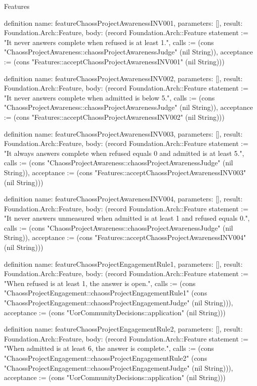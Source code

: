 \begin{lexlean}{Features}
\begin{semanticmodule}
definition{
  name: featureChaossProjectAwarenessINV001,
  parameters: [],
  result: Foundation.Arch::Feature,
  body: (record Foundation.Arch::Feature {statement := "It never answers complete when refused is at least 1.", calls := (cons "ChaossProjectAwareness::chaossProjectAwarenessJudge" (nil String)), acceptance := (cons "Features::acceptChaossProjectAwarenessINV001" (nil String))})
}

definition{
  name: featureChaossProjectAwarenessINV002,
  parameters: [],
  result: Foundation.Arch::Feature,
  body: (record Foundation.Arch::Feature {statement := "It never answers complete when admitted is below 5.", calls := (cons "ChaossProjectAwareness::chaossProjectAwarenessJudge" (nil String)), acceptance := (cons "Features::acceptChaossProjectAwarenessINV002" (nil String))})
}

definition{
  name: featureChaossProjectAwarenessINV003,
  parameters: [],
  result: Foundation.Arch::Feature,
  body: (record Foundation.Arch::Feature {statement := "It always answers complete when refused equals 0 and admitted is at least 5.", calls := (cons "ChaossProjectAwareness::chaossProjectAwarenessJudge" (nil String)), acceptance := (cons "Features::acceptChaossProjectAwarenessINV003" (nil String))})
}

definition{
  name: featureChaossProjectAwarenessINV004,
  parameters: [],
  result: Foundation.Arch::Feature,
  body: (record Foundation.Arch::Feature {statement := "It never answers unmeasured when admitted is at least 1 and refused equals 0.", calls := (cons "ChaossProjectAwareness::chaossProjectAwarenessJudge" (nil String)), acceptance := (cons "Features::acceptChaossProjectAwarenessINV004" (nil String))})
}

definition{
  name: featureChaossProjectEngagementRule1,
  parameters: [],
  result: Foundation.Arch::Feature,
  body: (record Foundation.Arch::Feature {statement := "When refused is at least 1, the answer is open.", calls := (cons "ChaossProjectEngagement::chaossProjectEngagementRule1" (cons "ChaossProjectEngagement::chaossProjectEngagementJudge" (nil String))), acceptance := (cons "UorCommunityDecisions::application" (nil String))})
}

definition{
  name: featureChaossProjectEngagementRule2,
  parameters: [],
  result: Foundation.Arch::Feature,
  body: (record Foundation.Arch::Feature {statement := "When admitted is at least 6, the answer is complete.", calls := (cons "ChaossProjectEngagement::chaossProjectEngagementRule2" (cons "ChaossProjectEngagement::chaossProjectEngagementJudge" (nil String))), acceptance := (cons "UorCommunityDecisions::application" (nil String))})
}


\end{semanticmodule}
\end{lexlean}
